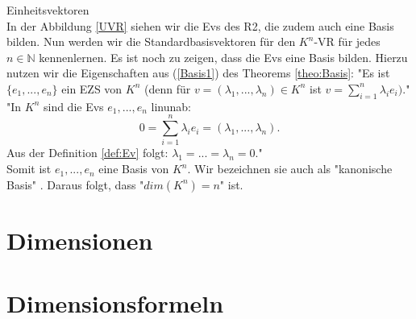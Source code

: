 \theoremstyle{example}
\begin{example}{Einheitsvektoren}
\\ In der Abbildung \ref{UVR} siehen wir die \aclp{Ev} des \acl{R2}, die zudem auch eine Basis bilden. Nun werden wir die Standardbasisvektoren für den $K^n$-\acl{VR} für jedes $n \in \mathbb{N}$ kennenlernen.
Es ist noch zu zeigen, dass die \aclp{Ev} eine Basis bilden. Hierzu nutzen wir die Eigenschaften aus (\ref{Basis1}) des Theorems \ref{theo:Basis}:
"Es ist $\{e_1,...,e_n\}$ ein \acl{EZS} von $K^n$ (denn für $v =(\lambda_1,...,\lambda_n) \in K^n$ ist $v = \sum \limits_{i=1}^{n} \lambda_i e_i)$.\grqq" \cite[S. 40, 9.9]{Skript}
\\"In $K^n$ sind die \aclp{Ev} $e_1,...,e_n$ \acl{linunab}: \[0=\sum \limits_{i=1}^{n} \lambda_i e_i = (\lambda_1,...,\lambda_n)\text{.}\]
Aus der Definition \ref{def:Ev} folgt: $\lambda_1=...=\lambda_n=0$." \cite[S. 41, 9.14]{S. 41}
\\ Somit ist ${e_1,...,e_n}$ eine Basis von $K^n$. Wir bezeichnen sie auch als "kanonische Basis" \cite[S. 42, 9.17]{Skript} . Daraus folgt, dass "$dim(K^n) = n$" \cite[S. 44, 9.24 (a)]{Skript} ist.
\end{example}

\section{Dimensionen}
\label{sec:Dimensionen}


\section{Dimensionsformeln}
\label{sec:Dim.formel}
